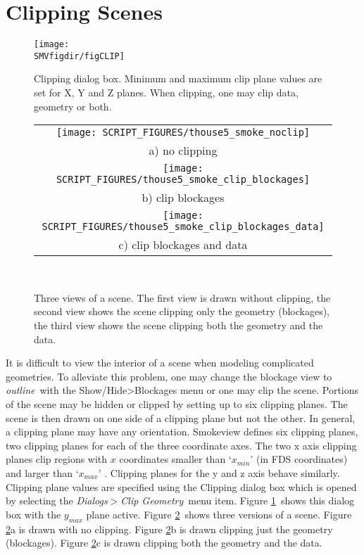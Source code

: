 \documentclass[11pt,twoside]{book}
\begin{document}
\section{Clipping Scenes}
\label{section:clipping}

\begin{figure}[bph]
\begin{center}
\texttt{[image: \\SMVfigdir/figCLIP]}
\end{center}
\caption[Clipping dialog box.]{Clipping dialog box.
Minimum and maximum clip plane values are set for X, Y and Z planes.
When clipping, one may clip data, geometry or both. }
\label{figCLIP}
\end{figure}

\begin{figure}[bph]
\begin{center}
\begin{tabular}{c}
\texttt{[image: SCRIPT\_FIGURES/thouse5\_smoke\_noclip]}\\
a) no clipping\\
\texttt{[image: SCRIPT\_FIGURES/thouse5\_smoke\_clip\_blockages]}\\
b) clip blockages\\
\texttt{[image: SCRIPT\_FIGURES/thouse5\_smoke\_clip\_blockages\_data]}\\
c) clip blockages and data\\
\end{tabular}
\end{center}
\caption[Clipping a scene.]{Three views of a scene. The first view
is drawn without clipping, the second view shows the scene
clipping only the geometry (blockages), the third view shows the
scene clipping both the geometry and the data.}\ \label{figCLIPPED}
\end{figure}

It is difficult to view the interior of a scene when modeling
complicated geometries.  To alleviate this problem, one may change the blockage view
to {\em outline}\ with the Show/Hide>Blockages menu or one may clip the scene.
Portions of
the scene may be hidden or clipped by setting up to six clipping
planes. The scene is then drawn on one side of a clipping plane but
not the other. In general, a clipping plane may have any
orientation. Smokeview defines six clipping planes, two clipping planes for each of the
three coordinate axes.   The two x axis clipping planes clip
regions with $x$ coordinates smaller than `$x_{min}$' (in FDS coordinates) and larger than `$x_{max}$' .
Clipping planes for the y and z axis behave similarly.
Clipping plane values are
specified using the Clipping dialog box which is opened by
selecting the {\em Dialogs$>$Clip Geometry}\ menu item. Figure
\ref{figCLIP}\ shows this dialog box with the $y_{max}$ plane
active. Figure \ref{figCLIPPED}\ shows three versions of a scene.
Figure \ref{figCLIPPED}a is drawn with no clipping. Figure
\ref{figCLIPPED}b is drawn clipping just the geometry (blockages).
Figure \ref{figCLIPPED}c is drawn clipping both the geometry and
the data.
\end{document}
